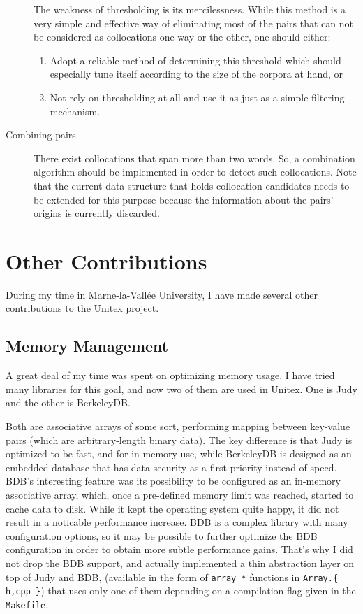 \documentclass[a4paper,12pt,oneside]{article}
\begin{document}
\begin{description}
	The weakness of thresholding is its mercilessness. While this method is a very simple and effective way of eliminating most of the pairs that can not be considered as collocations one way or the other, one should either:
	\begin{enumerate}
		\item Adopt a reliable method of determining this threshold which should especially tune itself according to the size of the corpora at hand, or

		\item Not rely on thresholding at all and use it as just as a simple filtering mechanism.
	\end{enumerate}

\item[Combining pairs] 
	There exist collocations that span more than two words. So, a combination algorithm should be implemented in order to detect such collocations. Note that the current data structure that holds collocation candidates needs to be extended for this purpose because the information about the pairs' origins is currently discarded.

\end{description}

\section{Other Contributions}
During my time in Marne-la-Vallée University, I have made several other contributions to the Unitex project.

\subsection{Memory Management}
A great deal of my time was spent on optimizing memory usage. I have tried many libraries for this goal, and now two of them are used in Unitex. One is Judy and the other is BerkeleyDB.

Both are associative arrays of some sort, performing mapping between key-value pairs (which are arbitrary-length binary data). The key difference is that Judy is optimized to be fast, and for in-memory use, while BerkeleyDB is designed as an embedded database that has data security as a first priority instead of speed. BDB's interesting feature was its possibility to be configured as an in-memory associative array, which, once a pre-defined memory limit was reached, started to cache data to disk. While it kept the operating system quite happy, it did not result in a noticable performance increase. BDB is a complex library with many configuration options, so it may be possible to further optimize the BDB configuration in order to obtain more subtle performance gains. That's why I did not drop the BDB support, and actually implemented a thin abstraction layer on top of Judy and BDB, (available in the form of \texttt{array\_*} functions in \texttt{Array.\{ h,cpp \}}) that uses only one of them depending on a compilation flag given in the \texttt{Makefile}.
\end{document}
